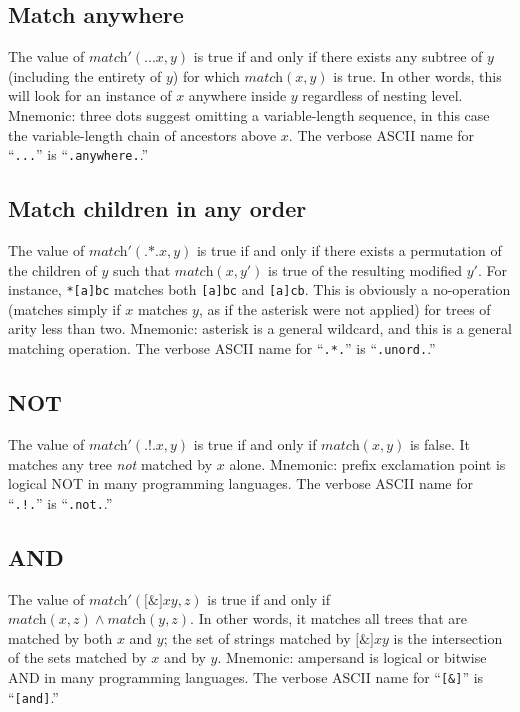 \documentclass[twocolumn]{report}
\begin{document}
\subsection{Match anywhere}

The value of $\textit{match}'(\texttt{...}x,y)$ is true if and only if there
exists any subtree of $y$ (including the entirety of $y$) for which
$\textit{match}(x,y)$ is true.  In other words, this will look for an
instance of $x$ anywhere inside $y$ regardless of nesting level.  Mnemonic:
three dots suggest omitting a variable-length sequence, in this case the
variable-length chain of ancestors above $x$.
The verbose ASCII name for ``\texttt{...}'' is ``\texttt{.anywhere.}.''

\subsection{Match children in any order}

The value of $\textit{match}'(\texttt{.*.}x,y)$ is true if and only if there
exists a permutation of the children of $y$ such that $\textit{match}(x,y')$
is true of the resulting modified $y'$.  For instance, \texttt{*[a]bc}
matches both \texttt{[a]bc} and \texttt{[a]cb}.  This is obviously a
no-operation (matches simply if $x$ matches $y$, as if the asterisk were not
applied) for trees of arity less than two.  Mnemonic: asterisk is a general
wildcard, and this is a general matching operation.
The verbose ASCII name for ``\texttt{.*.}'' is ``\texttt{.unord.}.''

\subsection{NOT}

The value of $\textit{match}'(\texttt{.!.}x,y)$ is true if and only if
$\textit{match}(x,y)$ is false.  It matches any tree \emph{not} matched by
$x$ alone.  Mnemonic:  prefix exclamation point is logical NOT in many
programming languages.
The verbose ASCII name for ``\texttt{.!.}'' is ``\texttt{.not.}.''

\subsection{AND}

The value of $\textit{match}'(\texttt{[\&]}xy,z)$ is true if and only if
$\textit{match}(x,z) \wedge \textit{match}(y,z)$.  In other words, it
matches all trees that are matched by both $x$ and $y$; the set of strings
matched by $\texttt{[\&]}xy$ is the intersection of the sets matched by $x$
and by $y$.  Mnemonic: ampersand is logical or bitwise AND in many
programming languages.
The verbose ASCII name for ``\texttt{[\&]}'' is ``\texttt{[and]}.''
\end{document}
